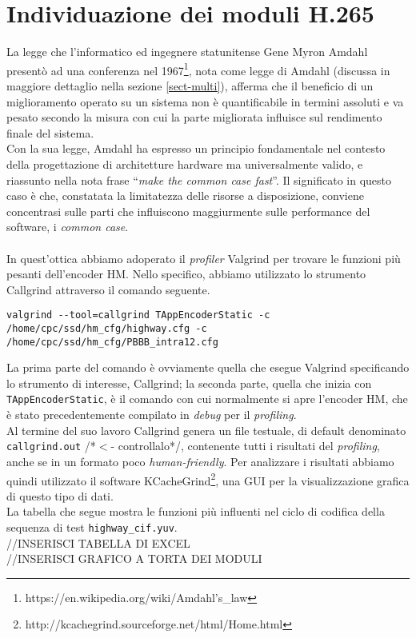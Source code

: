 \section{Individuazione dei moduli H.265}
La legge che l'informatico ed ingegnere statunitense Gene Myron Amdahl presentò 
ad una conferenza nel 
1967\footnote{https://en.wikipedia.org/wiki/Amdahl's\_law}, nota come legge di 
Amdahl (discussa in maggiore dettaglio nella sezione 
\ref{sect-multi}), afferma che il beneficio di un miglioramento operato su un 
sistema non è quantificabile in termini assoluti e va pesato secondo la misura 
con 
cui la parte migliorata influisce sul rendimento finale del sistema. \\
Con la sua legge, Amdahl ha espresso un principio fondamentale nel 
contesto della progettazione di architetture hardware ma universalmente valido, 
e riassunto nella nota frase ``\emph{make the common case fast}''. Il 
significato in questo caso è che, constatata la limitatezza delle risorse a 
disposizione, 
conviene concentrasi sulle parti che influiscono maggiurmente 
sulle performance del software, i \emph{common case}.
\\ \\
In quest'ottica abbiamo adoperato il \emph{profiler} Valgrind per trovare le 
funzioni più pesanti dell'encoder HM. Nello specifico, abbiamo utilizzato lo 
strumento Callgrind attraverso il comando seguente. \\
\begin{lstlisting}[breaklines]
valgrind --tool=callgrind TAppEncoderStatic -c 
/home/cpc/ssd/hm_cfg/highway.cfg -c 
/home/cpc/ssd/hm_cfg/PBBB_intra12.cfg
\end{lstlisting}
La prima parte del comando è ovviamente quella che esegue Valgrind specificando 
lo strumento di interesse, Callgrind; la seconda parte, quella che inizia con 
\verb|TAppEncoderStatic|, è il comando con cui normalmente si apre l'encoder 
HM, che è stato precedentemente compilato in \emph{debug} per il 
\emph{profiling}. \\
Al termine del suo lavoro Callgrind genera un file testuale, di default 
denominato \verb|callgrind.out| /*$<$- controllalo*/, contenente tutti i 
risultati 
del \emph{profiling}, anche se in un formato poco \emph{human-friendly}. 
Per analizzare i risultati abbiamo quindi utilizzato il software 
KCacheGrind\footnote{http://kcachegrind.sourceforge.net/html/Home.html}, una 
GUI per la visualizzazione grafica di questo tipo di dati. \\
La tabella che segue mostra le funzioni più influenti nel ciclo di codifica 
della sequenza di test \verb|highway_cif.yuv|.
\\ //INSERISCI TABELLA DI EXCEL
\\ //INSERISCI GRAFICO A TORTA DEI MODULI

